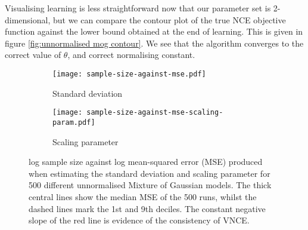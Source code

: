 \documentclass[11pt, oneside]{article}
\theoremstyle{definition}
\begin{document}
Visualising learning is less straightforward now that our parameter set is 2-dimensional, but we can compare the contour plot of the true NCE objective function against the lower bound obtained at the end of learning. This is given in figure \ref{fig:unnormalised mog contour}. We see that the algorithm converges to the correct value of $\theta$, and correct normalising constant.


\begin{figure}[!tpb]
\vspace{-15mm}
\centering
\begin{subfigure}{.5\textwidth}
  \centering
  \texttt{[image: sample-size-against-mse.pdf]}
  \caption{Standard deviation}
  \label{fig:sub1}
\end{subfigure}%
\begin{subfigure}{.5\textwidth}
  \centering
  \texttt{[image: sample-size-against-mse-scaling-param.pdf]}
  \caption{Scaling parameter}
  \label{fig:sub2}
\end{subfigure}
\caption{log sample size against log mean-squared error (MSE) produced when estimating the standard deviation and scaling parameter for 500 different unnormalised Mixture of Gaussian models. The thick central lines show the median MSE of the 500 runs, whilst the dashed lines mark the 1st and 9th deciles. The constant negative slope of the red line is evidence of the consistency of VNCE.}
\label{fig:mse-mog}
\end{figure}
\end{document}
